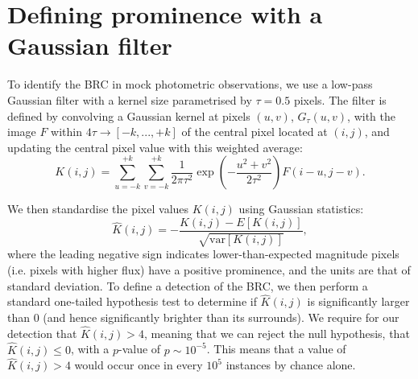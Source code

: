 \documentclass[twocolumn]{aastex631}
\begin{document}


\appendix

\section{Defining prominence with a Gaussian filter}\label{sec:app_prom}
To identify the BRC in mock photometric observations, we use a low-pass Gaussian filter with a kernel size parametrised by $\tau=0.5$ pixels.
The filter is defined by convolving a Gaussian kernel at pixels $(u,v)$, $G_\tau(u,v)$, with the image $F$ within $4\tau\rightarrow[-k,...,+k]$ of the central pixel located at $(i,j)$, and updating the central pixel value with this weighted average:
\begin{equation}
    K(i, j) = \sum_{u=-k}^{+k} \sum_{v=-k}^{+k} \frac{1}{2\pi\tau^2} \exp\left( -\frac{u^2 + v^2}{2\tau^2}\right) F(i-u, j-v).
\end{equation}

We then standardise the pixel values $K(i,j)$ using Gaussian statistics:
\begin{equation}
    \hat{K}(i,j) = -\frac{K(i,j)-E[K(i,j)]}{\sqrt{\mathrm{var}[K(i,j)]}},
\end{equation}
where the leading negative sign indicates lower-than-expected magnitude pixels (i.e. pixels with higher flux) have a positive prominence, and the units are that of standard deviation.
To define a detection of the BRC, we then perform a standard one-tailed hypothesis test to determine if $\hat{K}(i,j)$ is significantly larger than 0 (and hence significantly brighter than its surrounds).
We require for our detection that $\hat{K}(i,j) > 4$, meaning that we can reject the null hypothesis, that $\hat{K}(i,j)\leq0$, with a $p$-value of $p\sim10^{-5}$.
This means that a value of $\hat{K}(i,j)>4$ would occur once in every $10^5$ instances by chance alone.
\end{document}
